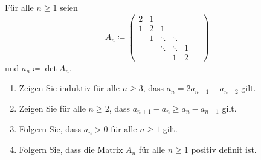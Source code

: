 \documentclass[a4paper, 10pt]{scrartcl}
\begin{document}
\begin{question}
  Für alle $n \geq 1$ seien
  \[
              A_n
    \coloneqq \begin{pmatrix}
                2 & 1 &         &         &   \phantom{\ddots}  \\
                1 & 2 & 1       &         &   \phantom{\ddots}  \\
                  & 1 & \ddots  & \ddots  &   \phantom{\ddots}  \\
                  &   & \ddots  & \ddots  & 1 \phantom{\ddots}  \\
                  &   &         &      1  & 2 \phantom{\ddots}
              \end{pmatrix}
  \]
  und $a_n \coloneqq \det A_n$.
  \begin{enumerate}
    \item
      Zeigen Sie induktiv für alle $n \geq 3$, dass $a_n = 2 a_{n-1} - a_{n-2}$ gilt.
    \item
      Zeigen Sie für alle $n \geq 2$, dass $a_{n+1} - a_n \geq a_n - a_{n-1}$ gilt.
    \item
      Folgern Sie, dass $a_n > 0$ für alle $n \geq 1$ gilt.
    \item
      Folgern Sie, dass die Matrix $A_n$ für alle $n \geq 1$ positiv definit ist.
  \end{enumerate}
\end{question}
\end{document}
